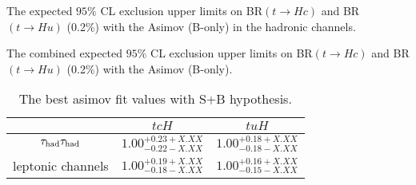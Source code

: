 \begin{table}[htb]
\caption{ The expected $95\%$ CL exclusion upper limits on BR$(t\to Hc)$ and BR$(t\to Hu)$ (0.2\%) with the Asimov (B-only) in the hadronic channels.}

\label{tab:tab_xTFW_limit}
\end{table}

\begin{table}[htb]
\caption{ The combined expected $95\%$ CL exclusion upper limits on BR$(t\to Hc)$ and BR$(t\to Hu)$ (0.2\%) with the Asimov (B-only).}

\label{tab:limit}
\end{table}

\begin{table}[htb]
\caption{ The best asimov fit values with S+B hypothesis. }
\centering
\begin{tabular}{|c|c|c|} \hline
  & $tcH$ & $tuH$ \\ \hline
  $\tau_\text{had}{}\tau_\text{had}$ & $1.00^{+0.23 +X.XX}_{-0.22 -X.XX}$ & $1.00^{+0.18 +X.XX}_{-0.18 -X.XX}$ \\ \hline
  leptonic channels & $1.00^{+0.19 +X.XX}_{-0.18 -X.XX}$ & $1.00^{+0.16 +X.XX}_{-0.15 -X.XX}$ \\ \hline
\end{tabular}
\label{tab:tab_best_fit}
\end{table}


